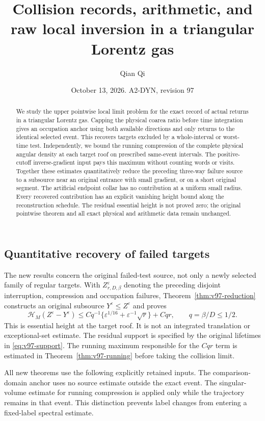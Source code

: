 \documentclass[11pt,reqno]{amsart}
\title[Collision records and raw local inversion]{Collision records, arithmetic, and raw local inversion in a triangular Lorentz gas}
\author{Qian Qi}
\date{October 13, 2026. A2-DYN, revision 97}
\numberwithin{equation}{section}
\theoremstyle{definition}
\theoremstyle{remark}\newtheorem{remark}[theorem]{Remark}
\begin{document}
\raggedbottom
\begin{abstract}
We study the upper pointwise local limit problem for the exact record
of actual returns in a triangular Lorentz gas. Capping the physical
coarea ratio before time integration gives an occupation anchor using
both available directions and only returns to the identical selected
event. This recovers targets excluded by a whole-interval or worst-time
test. Independently, we bound the running compression of the complete
physical angular density at each target roof on prescribed same-event
intervals. The positive-cutoff inverse-gradient input pays this maximum
without counting words or visits. Together these estimates quantitatively
reduce the preceding three-way failure source to a subsource near an
original entrance with small gradient, or on a short original segment.
The artificial endpoint collar has no contribution at a uniform small
radius. Every recovered contribution has an explicit vanishing height
bound along the reconstruction schedule. The residual essential height
is not proved zero; the original pointwise theorem and all exact physical
and arithmetic data remain unchanged.
\end{abstract}
\maketitle


\subsection{Quantitative recovery of failed targets}
The new results concern the original failed-test source, not only a
newly selected family of regular targets. With $Z_{r,D,\beta}^\varepsilon$
denoting the preceding disjoint interruption, compression and
occupation failures, Theorem~\ref{thm:v97-reduction} constructs an
original subsource $Y^\varepsilon\le Z^\varepsilon$ and proves
\[
 \mathcal H_M(Z^\varepsilon-Y^\varepsilon)
 \le Cq^{-1}\{\varepsilon^{1/16}+\varepsilon^{-1}\sqrt r\}+Cqr,
 \qquad q=\beta/D\le1/2.
\]
This is essential height at the target roof. It is not an integrated
translation or exceptional-set estimate. The residual support is
specified by the original lifetimes in \eqref{eq:v97-support}.
The running maximum responsible for the $Cqr$ term is estimated in
Theorem~\ref{thm:v97-running} before taking the collision limit.

All new theorems use the following explicitly retained inputs. The
comparison-domain anchor uses no source estimate outside the exact
event. The singular-volume estimate for running compression is applied
only while the trajectory remains in that event. This distinction
prevents label changes from entering a fixed-label spectral estimate.







\appendix

\enlargethispage{3\baselineskip}

\end{document}
